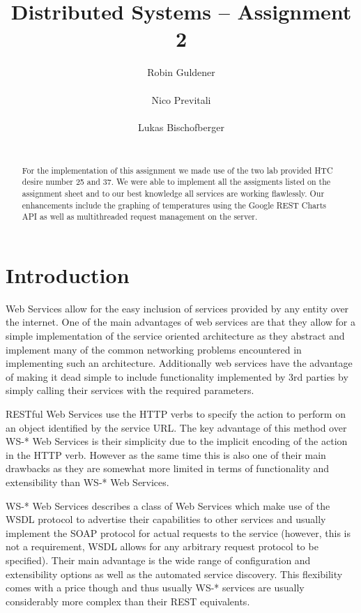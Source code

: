 \documentclass{report}
\title{Distributed Systems -- Assignment 2}
\author{
%
%
\alignauthor Robin Guldener\\
	\affaddr{ETH ID 11-930-369}\\
	\email{robing@student.ethz.ch}
\alignauthor Nico Previtali\\
	\affaddr{ETH ID 11-926-433}\\
	\email{pnico@student.ethz.ch}
\alignauthor Lukas Bischofberger\\
	\affaddr{ETH ID 11-915-907}\\
	\email{lukasbi@student.ethz.ch}
}
\begin{document}
\maketitle

\begin{abstract}
For the implementation of this assignment we made use of the two lab provided HTC desire number 25 and 37. We were able to implement all the assigments listed on the assignment sheet and to our best knowledge all services are working flawlessly. Our enhancements include the graphing of temperatures using the Google REST Charts API as well as multithreaded request management on the server.
\end{abstract}

\section{Introduction}

Web Services allow for the easy inclusion of services provided by any entity over the internet. One of the main advantages of web services are that they allow for a simple implementation of the service oriented architecture as they abstract and implement many of the common networking problems encountered in implementing such an architecture. Additionally web services have the advantage of making it dead simple to include functionality implemented by 3rd parties by simply calling their services with the required parameters.

RESTful Web Services use the HTTP verbs to specify the action to perform on an object identified by the service URL. The key advantage of this method over WS\hbox{-}* Web Services is their simplicity due to the implicit encoding of the action in the HTTP verb. However as the same time this is also one of their main drawbacks as they are somewhat more limited in terms of functionality and extensibility than WS\hbox{-}* Web Services.

WS\hbox{-}* Web Services describes a class of Web Services which make use of the WSDL protocol to advertise their capabilities to other services and usually implement the SOAP protocol for actual requests to the service (however, this is not a requirement, WSDL allows for any arbitrary request protocol to be specified). Their main advantage is the wide range of configuration and extensibility options as well as the automated service discovery. This flexibility comes with a price though and thus usually WS\hbox{-}* services are usually considerably more complex than their REST equivalents.
\end{document}
